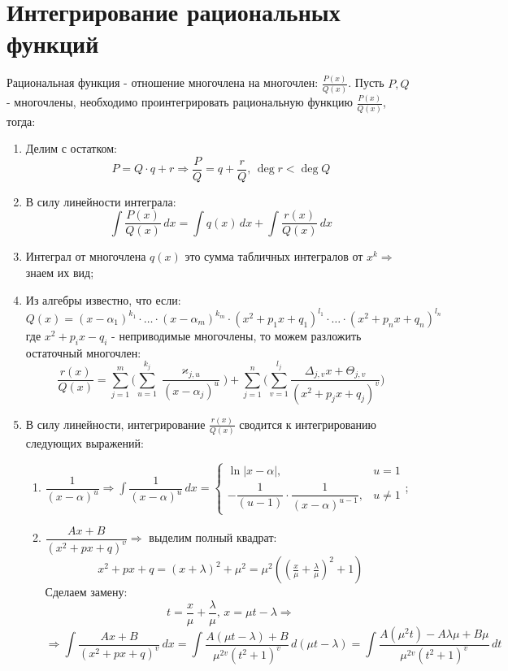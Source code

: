 \documentclass[12pt]{article}
\newcommand{\dx}{\, dx}
\newcommand{\dd}{\, d}
\theoremstyle{definition}
\DeclareMathOperator{\dint}{\displaystyle\int}
\begin{document}
\section*{Интегрирование рациональных функций}
Рациональная функция - отношение многочлена на многочлен: $\tfrac{P(x)}{Q(x)}$. Пусть $P,Q$ - многочлены, необходимо проинтегрировать рациональную функцию $\tfrac{P(x)}{Q(x)}$, тогда:
\begin{enumerate}[label={(\arabic*)}]
	\item Делим с остатком: 
	$$
		P = Q{\cdot}q + r \Rightarrow \dfrac{P}{Q} = q + \dfrac{r}{Q}, \, \deg{r} < \deg{Q}
	$$
	\item В силу линейности интеграла: 
	$$
		\dint \dfrac{P(x)}{Q(x)} \, dx = \dint q(x) \, dx + \dint \dfrac{r(x)}{Q(x)} \, dx
	$$
	\item Интеграл от многочлена $q(x)$ это сумма табличных интегралов от $x^k \Rightarrow$ знаем их вид;
	\item Из алгебры известно, что если: 
	$$
		Q(x) = (x - \alpha_1)^{k_1}\cdot\dotsc\cdot(x-\alpha_m)^{k_m}\cdot(x^2 + p_1 x + q_1)^{l_1} \cdot \dotsc \cdot (x^2 + p_n x + q_n)^{l_n}
	$$ 
	где $x^2 + p_i x - q_i$ - неприводимые многочлены, то можем разложить остаточный многочлен:
	$$
		\dfrac{r(x)}{Q(x)} = \displaystyle \sum_{j=1}^m \bigg(\sum_{u=1}^{k_j}\dfrac{\varkappa_{j,u}}{(x-\alpha_j)^u} \bigg) + \sum_{j=1}^n \bigg(\sum_{v=1}^{l_j}\dfrac{\Delta_{j,v}x + \Theta_{j,v}}{(x^2 + p_j x + q_j)^v} \bigg)
	$$
	\item В силу линейности, интегрирование $\tfrac{r(x)}{Q(x)}$ сводится к интегрированию следующих выражений: 
	\begin{enumerate}[label={(\Roman*)}]
		\item $\dfrac{1}{(x-\alpha)^u} \Rightarrow \dint \dfrac{1}{(x-\alpha)^u} \dx = \begin{cases}
			\ln{|x-\alpha|}, & u = 1\\
			-\dfrac{1}{(u-1)}{\cdot}\dfrac{1}{(x - \alpha)^{u-1}}, & u \neq 1
		\end{cases}$;
		\item $\dfrac{Ax+B}{(x^2 + px + q)^v} \Rightarrow$ выделим полный квадрат: 
		$$
			x^2 + px + q = (x + \lambda)^2 + \mu^2 = \mu^2\left(\left(\tfrac{x}{\mu} + \tfrac{\lambda}{\mu}\right)^2 + 1 \right)
		$$
		Сделаем замену: 
		$$
			t = \dfrac{x}{\mu} + \dfrac{\lambda}{\mu}, \, x = \mu t - \lambda \Rightarrow 
		$$
		$$
			\Rightarrow \dint \dfrac{Ax + B}{(x^2 + px + q)^v} \dx = \dint \dfrac{A(\mu t - \lambda) + B}{\mu^{2v}(t^2 + 1)^v} \dd(\mu t - \lambda) = \dint \dfrac{A(\mu^2 t) - A\lambda\mu + B\mu}{\mu^{2v}(t^2 + 1)^v} \dd t
$$
\end{enumerate}
\end{enumerate}
\end{document}
